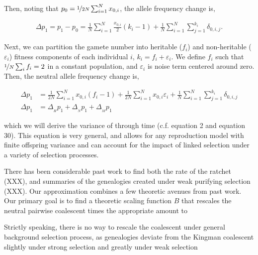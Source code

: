 \documentclass[11pt]{article}
\begin{document}
Then, noting that $p_0 = \nicefrac{1}{2N} \sum_{i=1}^N x_{0,i}$, the allele
frequency change is,

\begin{align}
  \Delta p_1 = p_1 - p_0 = \frac{1}{N} \sum_{i=1}^N \frac{x_{0,i}}{2} (k_i - 1) + \frac{1}{N} \sum_{i=1}^N \sum_{j=1}^{k_i} \delta_{0,i,j}.
\end{align}

Next, we can partition the gamete number into heritable ($f_i$) and
non-heritable ($\varepsilon_i$) fitness components of each individual $i$, $k_i
= f_i + \varepsilon_i$. We define $f_i$ such that $\nicefrac{1}{N} \sum_i f_i =
2$ in a constant population, and $\varepsilon_i$ is noise term centered around
zero. Then, the neutral allele frequency change is,

\begin{align}
  \Delta p_1 &= \frac{1}{2N} \sum_{i=1}^N x_{0,i} (f_i - 1) +
               \frac{1}{2N} \sum_{i=1}^N x_{0,i} \varepsilon_i
  + \frac{1}{N} \sum_{i=1}^N \sum_{j=1}^{k_i} \delta_{0,i,j} \\
  \Delta p_1 &= \Delta_{_H} p_1 + \Delta_{_N} p_1 + \Delta_{_M} p_1
\end{align}

which we will derive the variance of through time (c.f. \cite{Santiago1995-hx}
equation 2 and \cite{Buffalo2019-qs} equation 30). This equation is very
general, and allows for any reproduction model with finite offspring variance
and can account for the impact of linked selection under a variety of selection
processes.





There has been considerable past work to find both the rate of the ratchet
(XXX), and summaries of the genealogies created under weak purifying selection
(XXX). Our approximation combines a few theoretic avenues from past work. Our
primary goal is to find a theoretic scaling function $B$ that rescales the neutral
pairwise coalescent times the appropriate amount to 

Strictly speaking, there is no way to rescale the coalescent under general
background selection process, as genealogies deviate from the Kingman
coalescent slightly under strong selection
\parencite{Walczak2012-fi,Cvijovic2018-vd} and greatly under weak selection
\parencite{OFallon2010-my}
\end{document}
